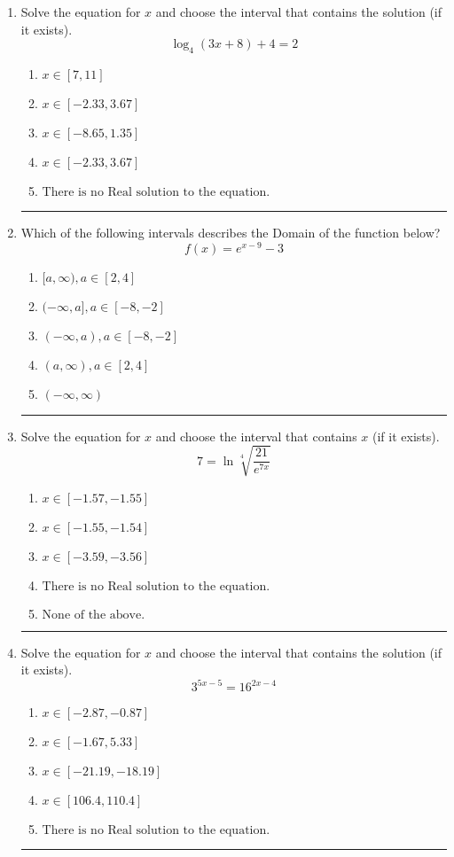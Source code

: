 \documentclass[14pt]{extbook}
\newcommand{\litem}[1]{\item#1\hspace*{-1cm}\rule{\textwidth}{0.4pt}}
\begin{document}
\begin{enumerate}
\litem{
Solve the equation for $x$ and choose the interval that contains the solution (if it exists).\[ \log_{4}{(3x+8)}+4 = 2 \]\begin{enumerate}[label=\Alph*.]
\item \( x \in [7, 11] \)
\item \( x \in [-2.33, 3.67] \)
\item \( x \in [-8.65, 1.35] \)
\item \( x \in [-2.33, 3.67] \)
\item \( \text{There is no Real solution to the equation.} \)

\end{enumerate} }
\litem{
Which of the following intervals describes the Domain of the function below?\[ f(x) = e^{x-9}-3 \]\begin{enumerate}[label=\Alph*.]
\item \( [a, \infty), a \in [2, 4] \)
\item \( (-\infty, a], a \in [-8, -2] \)
\item \( (-\infty, a), a \in [-8, -2] \)
\item \( (a, \infty), a \in [2, 4] \)
\item \( (-\infty, \infty) \)

\end{enumerate} }
\litem{
 Solve the equation for $x$ and choose the interval that contains $x$ (if it exists).\[  7 = \ln{\sqrt[4]{\frac{21}{e^{7x}}}} \]\begin{enumerate}[label=\Alph*.]
\item \( x \in [-1.57, -1.55] \)
\item \( x \in [-1.55, -1.54] \)
\item \( x \in [-3.59, -3.56] \)
\item \( \text{There is no Real solution to the equation.} \)
\item \( \text{None of the above.} \)

\end{enumerate} }
\litem{
Solve the equation for $x$ and choose the interval that contains the solution (if it exists).\[ 3^{5x-5} = 16^{2x-4} \]\begin{enumerate}[label=\Alph*.]
\item \( x \in [-2.87, -0.87] \)
\item \( x \in [-1.67, 5.33] \)
\item \( x \in [-21.19, -18.19] \)
\item \( x \in [106.4, 110.4] \)
\item \( \text{There is no Real solution to the equation.} \)


\end{enumerate}}
\end{enumerate}
\end{document}
